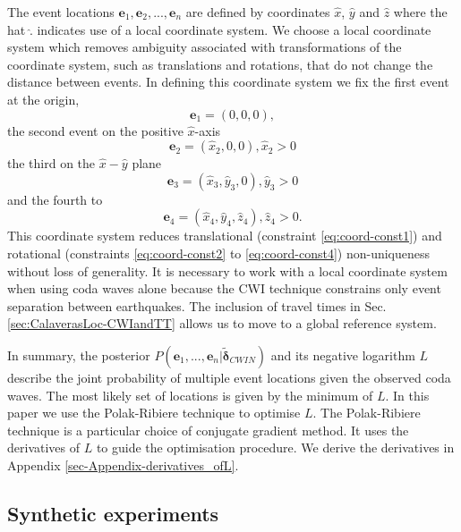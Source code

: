 \documentclass[extra]{gji}
\begin{document}
The event locations $\mathbf{e}_1, \mathbf{e}_2, ..., \mathbf{e}_n$
are defined by coordinates $\hat{x}$, $\hat{y}$ and $\hat{z}$
where the hat $\hat{.}$ indicates use of
a local coordinate system. We choose a local coordinate system
which removes ambiguity associated with transformations of the coordinate system,
such as translations and rotations, that do not change the distance between events.
In defining this coordinate system we fix the first event at the origin,
\begin{equation}
\label{eq:coord-const1}
\mathbf{e}_1 = (0,0,0),
\end{equation}
the second event on the positive $\hat{x}$-axis
\begin{equation}
\label{eq:coord-const2}
\mathbf{e}_2 = (\hat{x}_2, 0, 0), \hat{x}_2>0
\end{equation}
the third on the $\hat{x}-\hat{y}$ plane
\begin{equation}
\label{eq:coord-const3}
\mathbf{e}_3 = (\hat{x}_3,\hat{y}_3,0), \hat{y}_3>0
\end{equation}
and the fourth to
\begin{equation}
\label{eq:coord-const4}
\mathbf{e}_4 = (\hat{x}_4,\hat{y}_4,\hat{z}_4), \hat{z}_4>0.
\end{equation}
This coordinate system reduces translational (constraint \ref{eq:coord-const1})
and rotational (constraints \ref{eq:coord-const2} to \ref{eq:coord-const4}) non-uniqueness
without loss of generality. It is necessary to work with a local coordinate
system when using coda waves alone because the CWI technique constrains only event separation
between earthquakes. The inclusion of travel times in Sec. \ref{sec:CalaverasLoc-CWIandTT}
allows us to move to a global reference system.

In summary, the posterior $P(\mathbf{e}_1,...,\mathbf{e}_n | \widetilde{\mathbf{\delta}}_{CWIN})$ and its negative
logarithm $L$ describe the joint probability of multiple event locations given the observed coda waves.
The most likely set of locations is given by the minimum of $L$.   In this paper we use the Polak-Ribiere
technique \citep{dr_Press87a} to optimise $L$. The Polak-Ribiere
technique is a particular choice of conjugate gradient method. It uses the
derivatives of $L$ to guide the optimisation procedure. We derive the derivatives in Appendix \ref{sec-Appendix-derivatives_ofL}.

\subsection{Synthetic experiments}
\label{sec:benchmarking}
\end{document}
